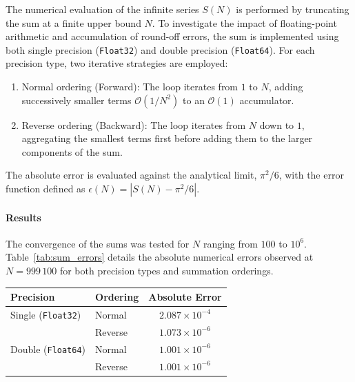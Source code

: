\begin{solution}
	The numerical evaluation of the infinite series $S(N)$ is performed by
	truncating the sum at a finite upper bound $N$. To investigate the impact of
	floating-point arithmetic and accumulation of round-off errors, the sum is
	implemented using both single precision (\texttt{Float32}) and double precision
	(\texttt{Float64}). For each precision type, two iterative strategies are
	employed:
	\begin{enumerate}
		\item Normal ordering (Forward): The loop iterates from $1$ to $N$,
		      adding successively smaller terms $\mathcal{O}(1/N^2)$ to an $\mathcal{O}(1)$
		      accumulator.
		\item Reverse ordering (Backward): The loop iterates from $N$ down
		      to $1$, aggregating the smallest terms first before adding them to the larger
		      components of the sum.
	\end{enumerate}
	The absolute error is evaluated against the analytical limit, $\pi^2/6$, with
	the error function defined as $\epsilon(N) = |S(N) - \pi^2/6|$.

	\paragraph{Results}
	The convergence of the sums was tested for $N$ ranging from $100$ to $10^6$.
	Table~\ref{tab:sum_errors} details the absolute numerical errors observed at $N
		= 999 \, 100$ for both precision types and summation orderings.

	\begin{center}
		\centering
		\label{tab:sum_errors}
		\renewcommand{\arraystretch}{1.2}
		\begin{tabular}{@{}llc@{}}
			\toprule
			Precision                 & Ordering & Absolute Error         \\
			\midrule
			Single (\texttt{Float32}) & Normal   & $2.087 \times 10^{-4}$ \\
			                          & Reverse  & $1.073 \times 10^{-6}$ \\
			Double (\texttt{Float64}) & Normal   & $1.001 \times 10^{-6}$ \\
			                          & Reverse  & $1.001 \times 10^{-6}$ \\
			\bottomrule
		\end{tabular}
	\end{center}


\end{solution}
